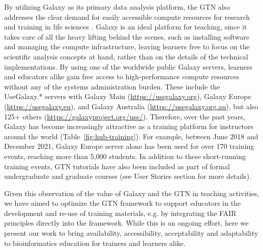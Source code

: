 \documentclass[10pt,letterpaper]{article}
\begin{document}
By utilizing Galaxy as its primary data analysis platform, the GTN also addresses the clear demand for easily accessible compute resources for research and training in life sciences \cite{Barone2017}.
Galaxy is an ideal platform for teaching, since it takes care of all the heavy lifting behind the scenes, such as installing software and managing the compute infrastructure, leaving learners free to focus on the scientific analysis concepts at hand, rather than on the details of the technical implementations. 
By using one of the worldwide public Galaxy servers, learners and educators alike gain free access to high-performance compute resources without any of the systems administration burden. These include the UseGalaxy.* servers with Galaxy Main (\url{https://usegalaxy.org}), Galaxy Europe (\url{https://usegalaxy.eu}), and Galaxy Australia (\url{https://usegalaxy.org.au}), but also 125+ others (\url{https://galaxyproject.org/use/}). 
Therefore, over the past years, Galaxy has become increasingly attractive as a training platform for instructors around the world (Table~\ref{fig:hub-training}). For example, between June 2018 and December 2021, Galaxy Europe server alone has been used for over 170 training events, reaching more than 5,000 students. %
In addition to these short-running training events, GTN tutorials have also been included as part of formal undergraduate and graduate courses (see User Stories section for more details). 

Given this observation of the value of Galaxy and the GTN in teaching activities, we have aimed to optimize the GTN framework to support educators in the development and re-use of training materials, e.g. by integrating the FAIR principles \cite{Wilkinson2016} directly into the framework.
While this is an ongoing effort, here we present our work to bring availability, accessibility, acceptability and adaptability to bioinformatics education for trainers and learners alike.
\end{document}
